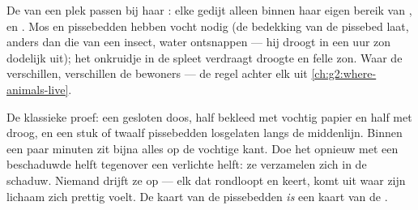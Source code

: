 \begin{proposition}\label{prop:g6:exploring-our-environment:decide}
De  van een plek passen bij haar : elke 
gedijt alleen binnen haar eigen bereik van ,  en
. Mos en pissebedden hebben vocht nodig (de bedekking van de
pissebed laat, anders dan die van een insect, water ontsnappen --- hij
droogt in een uur zon dodelijk uit); het onkruidje in de spleet verdraagt
droogte en felle zon. Waar de  verschillen, verschillen de
bewoners --- de regel achter elk  uit
\cref{ch:g2:where-animals-live}.
\end{proposition}
\admitted

\begin{example}[De pissebeddenkiezer]\label{ex:g6:exploring-our-environment:chooser}
De klassieke proef: een gesloten doos, half bekleed met vochtig papier en
half met droog, en een stuk of twaalf pissebedden losgelaten langs de
middenlijn. Binnen een paar minuten zit bijna alles op de vochtige kant.
Doe het opnieuw met een beschaduwde helft tegenover een verlichte helft:
ze verzamelen zich in de schaduw. Niemand drijft ze op --- elk  dat
rondloopt en keert, komt uit waar zijn lichaam zich prettig voelt. De
kaart van de pissebedden \emph{is} een kaart van de .
\end{example}


